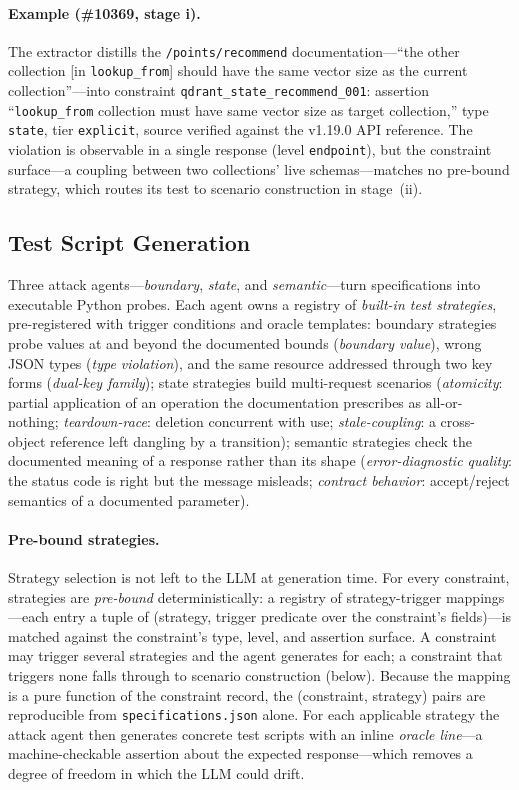 \documentclass[acmsmall,screen,review,anonymous]{acmart}
\begin{document}
\paragraph{Example (\#10369, stage i).}
The extractor distills the \texttt{/points/recommend} documentation---``the other collection [in \texttt{lookup\_from}] should have the same vector size as the current collection''---into constraint \texttt{qdrant\_state\_recommend\_001}: assertion ``\texttt{lookup\_from} collection must have same vector size as target collection,'' type \texttt{state}, tier \texttt{explicit}, source verified against the v1.19.0 API reference. The violation is observable in a single response (level \texttt{endpoint}), but the constraint surface---a coupling between two collections' live schemas---matches no pre-bound strategy, which routes its test to scenario construction in stage~(ii).

\subsection{Test Script Generation}
\label{subsec:generation}

Three attack agents---\emph{boundary}, \emph{state}, and \emph{semantic}---turn specifications into executable Python probes. Each agent owns a registry of \emph{built-in test strategies}, pre-registered with trigger conditions and oracle templates: boundary strategies probe values at and beyond the documented bounds (\emph{boundary value}), wrong JSON types (\emph{type violation}), and the same resource addressed through two key forms (\emph{dual-key family}); state strategies build multi-request scenarios (\emph{atomicity}: partial application of an operation the documentation prescribes as all-or-nothing; \emph{teardown-race}: deletion concurrent with use; \emph{stale-coupling}: a cross-object reference left dangling by a transition); semantic strategies check the documented meaning of a response rather than its shape (\emph{error-diagnostic quality}: the status code is right but the message misleads; \emph{contract behavior}: accept/reject semantics of a documented parameter).

\paragraph{Pre-bound strategies.}
Strategy selection is not left to the LLM at generation time. For every constraint, strategies are \emph{pre-bound} deterministically: a registry of strategy-trigger mappings---each entry a tuple of (strategy, trigger predicate over the constraint's fields)---is matched against the constraint's type, level, and assertion surface. A constraint may trigger several strategies and the agent generates for each; a constraint that triggers none falls through to scenario construction (below). Because the mapping is a pure function of the constraint record, the (constraint, strategy) pairs are reproducible from \texttt{specifications.json} alone. For each applicable strategy the attack agent then generates concrete test scripts with an inline \emph{oracle line}---a machine-checkable assertion about the expected response---which removes a degree of freedom in which the LLM could drift.
\end{document}
